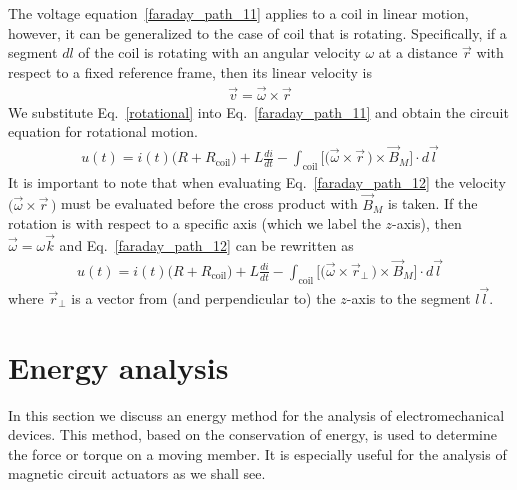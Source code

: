 \documentclass[12pt,a4paper,oneside]{book}
\begin{document}
\begin{onehalfspace}
The voltage equation~\ref{faraday_path_11} applies to a coil in linear motion, however, it can be generalized to the case of coil that is rotating. Specifically, if a segment $dl$ of the coil is rotating with an angular velocity $\omega$ at a distance $\vec{r}$ with respect to a fixed reference frame, then its linear velocity is
  \begin{equation}\label{rotational}
	\begin{aligned}
		\vec{v}=\vec{\omega}\times\vec{r}
	\end{aligned}
\end{equation} 
We substitute Eq.~\eqref{rotational} into Eq.~\eqref{faraday_path_11} and obtain the circuit equation for rotational motion.
   \begin{equation}\label{faraday_path_12}
 	\begin{aligned}
 		u(t) = i(t)\big(R+R_{\text{coil}}\big)+L\frac{di}{dt}-\int_{\text{coil}}\Big[\big(\vec{\omega}\times\vec{r}\,\big)\times\vec{B}_M\Big]\cdot d\vec{l}
 	\end{aligned}
 \end{equation} 
It is important to note that when evaluating Eq.~\eqref{faraday_path_12} the velocity $\big(\vec{\omega}\times\vec{r}\,\big)$ must be evaluated before the cross product with $\vec{B}_M$ is taken. If the rotation is with respect to a specific axis (which we label the $z$-axis), then $\vec{\omega}=\omega\vec{k}$ and Eq.~\eqref{faraday_path_12} can be rewritten as
   \begin{equation}\label{faraday_path_13}
	\begin{aligned}
		u(t) = i(t)\big(R+R_{\text{coil}}\big)+L\frac{di}{dt}-\int_{\text{coil}}\Big[\big(\vec{\omega}\times\vec{r}_{\perp }\,\big)\times\vec{B}_M\Big]\cdot d\vec{l}
	\end{aligned}
\end{equation} 
where $\vec{r}_{\perp}$ is a vector from (and perpendicular to) the $z$-axis to the segment $l\vec{l}$.

\section{Energy analysis}
In this section we discuss an energy method for the analysis of electromechanical devices. This method, based on the conservation of energy, is used to determine the force or torque on a moving member. It is especially useful for the analysis of magnetic circuit actuators as we shall see.


\end{onehalfspace}
\end{document}
